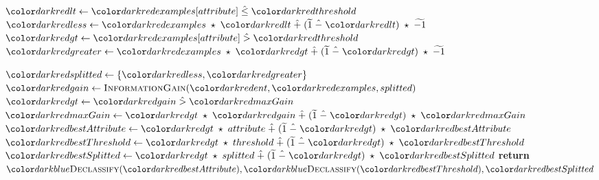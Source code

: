 \begin{algorithm}[H]
\begin{algorithmic}[1]
          \State $\red{lt} \gets \red{examples}[attribute] \hlte \red{threshold}$ 
          \State $\red{less} \gets \red{examples} \hmul \red{lt} \hplus (\enc{1} \hminus \red{lt}) \hmul \enc{-1} $ 
          \State $\red{gt} \gets \red{examples}[attribute] \hgt \red{threshold}$
          \State $\red{greater} \gets \red{examples} \hmul \red{gt} \hplus (\enc{1} \hminus \red{gt}) \hmul \enc{-1} $

          \State $\red{splitted} \gets \{\red{less}, \red{greater}\}$
          \State $\red{gain} \gets  \textsc{InformationGain}(\red{ent}, \red{examples}, splitted)$
          \State $\red{gt} \gets \red{gain} \hgt  \red{maxGain}$
          \State $\red{maxGain} \gets \red{gt} \hmul \red{gain} \hplus (\enc{1} \hminus \red{gt}) \hmul \red{maxGain}$
          \State $\red{bestAttribute} \gets \red{gt} \hmul attribute \hplus (\enc{1} \hminus \red{gt}) \hmul \red{bestAttribute}$
          \State $\red{bestThreshold} \gets \red{gt} \hmul threshold \hplus (\enc{1} \hminus \red{gt}) \hmul \red{bestThreshold}$
          \State $\red{bestSplitted} \gets \red{gt} \hmul splitted \hplus (\enc{1} \hminus \red{gt}) \hmul \red{bestSplitted}$
        \EndFor
    \EndIf
  \EndFor
  \State \textbf{return} $\blue{\textsc{Declassify}}(\red{bestAttribute}), \blue{\textsc{Declassify}}(\red{bestThreshold}), \red{bestSplitted}$
\EndProcedure
\end{algorithmic}
\end{algorithm}

